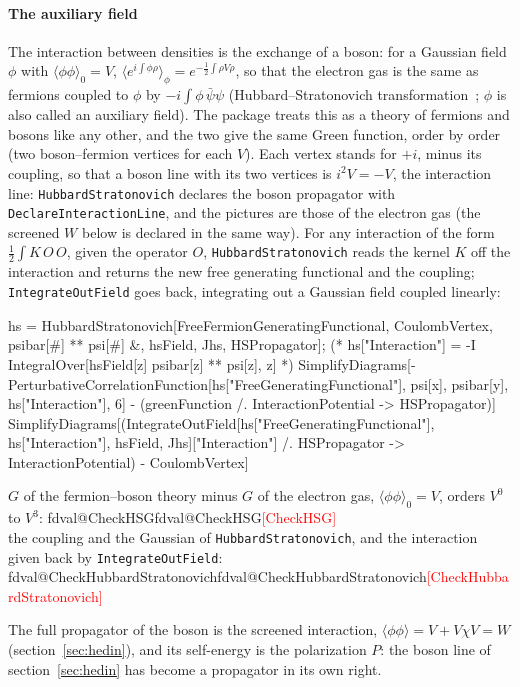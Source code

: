 \documentclass[11pt,a4paper]{article}
\makeatletter
\newcommand{\pkg}[1]{\texttt{#1}}
\newcommand{\val}[1]{\ifcsname fdval@#1\endcsname\csname fdval@#1\endcsname\else\textcolor{red}{[#1]}\fi}
\newcommand{\outval}[2][]{\val{#2}}
\makeatother
\begin{document}
\paragraph{The auxiliary field} The interaction between densities is the exchange of a boson: for a Gaussian field $\phi$
with $\langle\phi\phi\rangle_0=V$, $\langle e^{i\int\phi\rho}\rangle_\phi=e^{-\frac12\int\rho V\rho}$, so that the
electron gas is the same as fermions coupled to $\phi$ by $-i\int\phi\,\bar\psi\psi$ (Hubbard--Stratonovich
transformation~\cite{Stratonovich1958,Hubbard1959,NegeleOrland,AltlandSimons}; $\phi$ is also called an auxiliary field). The package treats this as a theory of
fermions and bosons like any other, and the two give the same Green function, order by order (two boson--fermion vertices
for each $V$). Each vertex stands for $+i$, minus its coupling, so that a boson line with its two vertices is $i^2V=-V$, the
interaction line: \pkg{HubbardStratonovich} declares the boson propagator with \pkg{DeclareInteractionLine}, and the
pictures are those of the electron gas (the screened $W$ below is declared in the same way). For any interaction of the
form $\frac12\int K\,O\,O$, given the operator $O$, \pkg{HubbardStratonovich} reads the kernel $K$ off the interaction and
returns the new free generating functional and the coupling;
\pkg{IntegrateOutField} goes back, integrating out a Gaussian field coupled linearly:
\begin{code}
hs = HubbardStratonovich[{FreeFermionGeneratingFunctional, CoulombVertex},
    psibar[#] ** psi[#] &, {hsField, Jhs}, HSPropagator];
(* hs["Interaction"] = -I IntegralOver[hsField[z] psibar[z] ** psi[z], {z}] *)
SimplifyDiagrams[-PerturbativeCorrelationFunction[hs["FreeGeneratingFunctional"],
    {psi[x], psibar[y]}, hs["Interaction"], 6] -
    (greenFunction /. InteractionPotential -> HSPropagator)]
SimplifyDiagrams[(IntegrateOutField[{hs["FreeGeneratingFunctional"], hs["Interaction"]},
    hsField, Jhs]["Interaction"] /. HSPropagator -> InteractionPotential) -
    CoulombVertex]
\end{code}
\begin{result}
$G$ of the fermion--boson theory minus $G$ of the electron gas, $\langle\phi\phi\rangle_0=V$, orders $V^0$ to $V^3$:
\outval[Total]{CheckHSG}\\
the coupling and the Gaussian of \pkg{HubbardStratonovich}, and the interaction given back by \pkg{IntegrateOutField}:
\outval[3]{CheckHubbardStratonovich}
\end{result}
The full propagator of the boson is the screened interaction, $\langle\phi\phi\rangle=V+V\chi V=W$ (section~\ref{sec:hedin}), and
its self-energy is the polarization $P$: the boson line of section~\ref{sec:hedin} has become a propagator in its own
right.
\end{document}
